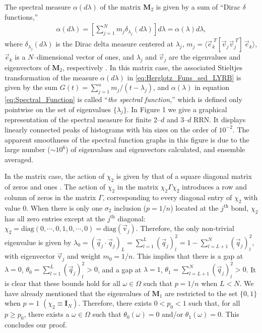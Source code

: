 \documentclass[english,12pt,jmp,graphicx]{revtex4-1}
\begin{document}
The spectral measure $\alpha(d\lambda)$ of the matrix $\mathbf{M}_2$ is given by
a sum of ``Dirac $\delta$ functions,''
%
\begin{align}\label{eq:Spectral_Function}
  \alpha(d\lambda)=
    \left[\sum_{j=1}^N m_j \delta_{\lambda_j}(d\lambda)\right]d\lambda
      =\alpha(\lambda)d\lambda,
\end{align}
%
where $\delta_{\lambda_j}(d\lambda)$ is the Dirac delta measure centered at $\lambda_j$,
$m_j=\langle\vec{e}_k^{\;T}[\vec{v}_j\vec{v}_j^{\;T}]\,\vec{e}_k\rangle$, 
$\vec{e}_k$ is a $N$--dimensional vector of ones, and $\lambda_j$ and
$\vec{v}_j$ are the eigenvalues and eigenvectors of $\mathbf{M}_2$,
respectively \cite{Golden:JoB:337}. In this matrix case, the
associated Stieltjes transformation of the measure $\alpha(d\lambda)$
in \eqref{eq:Herglotz_Funs_sed_LYRB} is 
given by the sum $G(t)=\sum_{j=1}^nm_j/(t-\lambda_j)$, and $\alpha(\lambda)$ in equation
\eqref{eq:Spectral_Function} is called ``\emph{the spectral
  function},'' which is defined only pointwise on the set of
eigenvalues $\{\lambda_j\}$. In Figure 1 we give a graphical
representation of the spectral measure for finite 2--$d$ and 3--$d$
RRN. It displays linearly connected peaks of histograms with bin
sizes on the order of $10^{-2}$. The apparent smoothness of the
spectral function graphs in this figure is due to the large number
($\sim10^6$) of eigenvalues and eigenvectors calculated, and ensemble
averaged. 

In the matrix case, the action of $\chi_2$ is given by that of a square
diagonal matrix of zeros and ones \cite{Golden:JoB:337}. The action
of $\chi_2$ in the matrix $\chi_2\Gamma\chi_2$ introduces a row and column
of zeros in the matrix $\Gamma$, corresponding to every diagonal entry of
$\chi_2$ with value 0. When there is only one $\sigma_2$ inclusion ($p=1/n$)
located at the $j^{\text{th}}$ bond, $\chi_2$ has all zero entries except
at the $j^{\text{th}}$ diagonal:
$\chi_2=\text{diag}(0,\cdots,0,1,0,\cdots,0)=\text{diag}(\vec{\text{v}}_j)$. Therefore, 
the only non-trivial eigenvalue is given by 
$\lambda_0=(\vec{q}_j\cdot\vec{q}_j)_L=\sum_{l=1}^L(\vec{q}_j)_l^2=1-\sum_{l=L+1}^N(\vec{q}_j)_l^2$, 
with eigenvector $\vec{\text{v}}_j$ and weight $m_0=1/n$. This  
implies that there is a gap at $\lambda=0$, $\theta_0=\sum_{l=1}^L(\vec{q}_j)_l^2>0$,
and a gap at $\lambda=1$, $\theta_1=\sum_{l=L+1}^N(\vec{q}_j)_l^2>0$. It is clear
that these bounds hold for all $\omega\in\Omega$ such that $p=1/n$ when $L<N$. We
have already mentioned that the eigenvalues of $\mathbf{M}_1$ are
restricted to the set $\{0,1\}$ when $p=1$
$(\chi_2\equiv\mathbf{I}_N)$. Therefore, there exists $0<p_0<1$ such that,
for all $p\geq p_0$, there exists a $\omega\in\Omega$ such that $\theta_0(\omega)=0$ and/or
$\theta_1(\omega)=0$. This concludes our proof.
\end{document}
